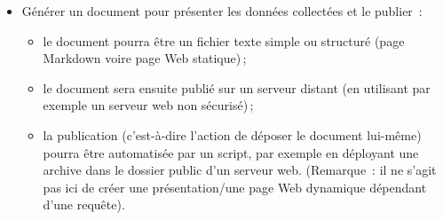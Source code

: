 {\begin{itemize}[topsep=5pt]
\begin{itemize}
    isoler/choisir/organiser les informations pertinentes\,;
  \item
    extraire des statistiques (moyennes, histogrammes)\,;
  \item
    produire des représentations graphiques (nuage de mots, tableaux
    comparatifs).
  \end{itemize}
\item
  Générer un document pour présenter les données collectées et le
  publier~:
  \begin{itemize}
  \item
    le document pourra être un fichier texte simple ou structuré (page
    Markdown voire page Web statique)\,;
  \item
    le document sera ensuite publié sur un serveur distant (en utilisant
    par exemple un serveur web non
    sécurisé)\,;
  \item
    la publication (c'est-à-dire l'action de déposer le document
    lui-même) pourra être automatisée par
    un script, par exemple en déployant une archive dans le dossier
    public d'un serveur web. (Remarque~:
    il ne s'agit pas ici de créer une présentation/une page Web
    dynamique dépendant d'une requête).
  \end{itemize}
\end{itemize}
}




